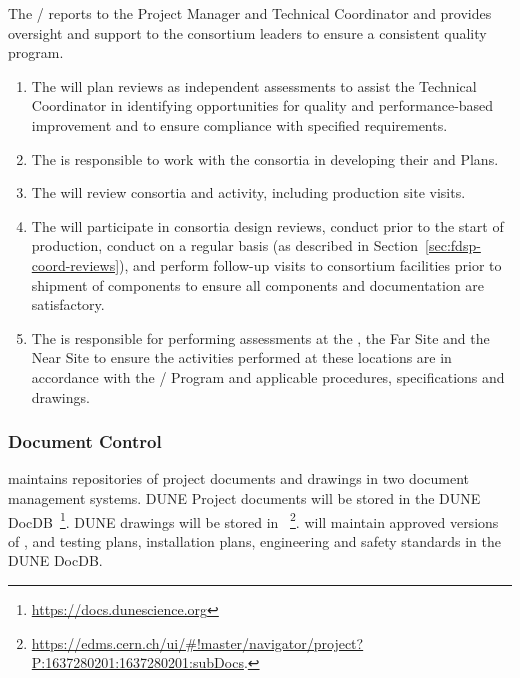 The /  reports
to the  Project Manager and  Technical
Coordinator and provides oversight and support to the consortium
leaders to ensure a consistent quality program.
\begin{enumerate}
  \item The  will plan reviews as independent assessments to assist
    the Technical Coordinator in identifying opportunities for
    quality and performance-based improvement and to ensure compliance
    with specified requirements.
  \item The  is responsible to work with the consortia in
    developing their  and  Plans.
  \item The  will review consortia  and  activity, including
    production site visits.
  \item The  will participate in consortia design reviews, conduct
     prior to the start of production,
    conduct  on a regular basis (as
    described in Section~\ref{sec:fdsp-coord-reviews}), and perform
    follow-up visits to consortium facilities prior to shipment of
    components to ensure all components and documentation are
    satisfactory.
\item The  is responsible for performing assessments at the
  , the Far Site and the Near Site to
  ensure the activities performed at these locations are in accordance
  with the /  Program and applicable procedures,
  specifications and drawings.
\end{enumerate}

\subsubsection{Document Control}
\label{sec:fdsp-coord-document}

 maintains repositories of project documents and drawings in two
document management systems.  DUNE Project documents will be stored in
the DUNE DocDB~\footnote{\url{https://docs.dunescience.org}}. DUNE drawings
will be stored in 
~\footnote{\url{https://edms.cern.ch/ui/\#!master/navigator/project?P:1637280201:1637280201:subDocs}.}.
 will maintain approved versions of ,  and testing plans,
installation plans, engineering and safety standards in the DUNE
DocDB.

